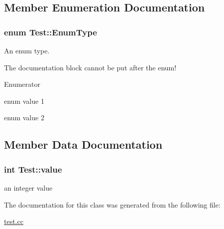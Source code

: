 \subsection{Member Enumeration Documentation}
\hypertarget{class_test_a26bf93efdaea3c6e2cfa4119c3755d3f}{}
\subsubsection[{Enum\+Type}]{\setlength{\rightskip}{0pt plus 5cm}enum {\bf Test\+::\+Enum\+Type}}\label{class_test_a26bf93efdaea3c6e2cfa4119c3755d3f}
An enum type.
\begin{DoxyItemize}
\item The documentation block cannot be put after the enum! 
\end{DoxyItemize}\begin{Desc}
\item[Enumerator]\par
\begin{description}
\item[{\em 
\hypertarget{class_test_a26bf93efdaea3c6e2cfa4119c3755d3faacfab1e4105c05a2e503931a0e82b5b0}{}E\+Val1\label{class_test_a26bf93efdaea3c6e2cfa4119c3755d3faacfab1e4105c05a2e503931a0e82b5b0}
}]enum value 1 \item[{\em 
\hypertarget{class_test_a26bf93efdaea3c6e2cfa4119c3755d3fae2fa04fb1c4db1f7d72b8781ba19ffcc}{}E\+Val2\label{class_test_a26bf93efdaea3c6e2cfa4119c3755d3fae2fa04fb1c4db1f7d72b8781ba19ffcc}
}]enum value 2 \end{description}
\end{Desc}


\subsection{Member Data Documentation}
\hypertarget{class_test_ad55002283eba8ffa062dfb849f6c077c}{}
\subsubsection[{value}]{\setlength{\rightskip}{0pt plus 5cm}int Test\+::value\hspace{0.3cm}{\ttfamily [protected]}}\label{class_test_ad55002283eba8ffa062dfb849f6c077c}
an integer value 

The documentation for this class was generated from the following file\+:\begin{DoxyCompactItemize}
\item 
\hyperlink{test_8cc}{test.\+cc}\end{DoxyCompactItemize}
